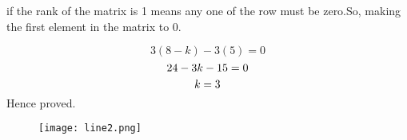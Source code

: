 \documentclass[12pt]{article}
\begin{document}
if the rank of the matrix is 1 means any one of the row must be zero.So, making the first element in the matrix to 0.

\begin{equation}
3(8-k)-3(5)=0
\end{equation} 
\begin{equation}
24-3k-15=0\\
\end{equation} 
\begin{equation}
k=3 \\
\end{equation} 
Hence proved.
\begin{figure}[h!]
	  \centering 
	  \texttt{[image: line2.png]}
	  \caption{}
	  \label{fig:line2.png}
	  \end{figure} 
\end{document}
